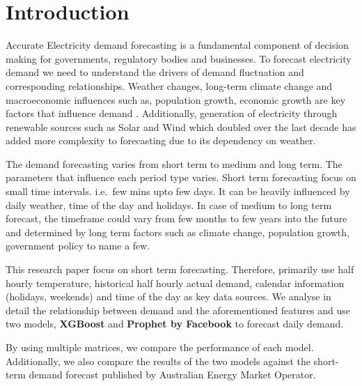 \documentclass[mstat,12pt]{unswthesis}
\begin{document}
%
%






\chapter{Introduction}\label{introduction}

Accurate Electricity demand forecasting is a fundamental component of
decision making for governments, regulatory bodies and businesses. To
forecast electricity demand we need to understand the drivers of demand
fluctuation and corresponding relationships. Weather changes, long-term
climate change and macroeconomic influences such as, population growth,
economic growth are key factors that influence demand \cite{a2024_nem}.
Additionally, generation of electricity through renewable sources such
as Solar and Wind which doubled over the last decade
\cite{energygovau_2024_renewables} has added more complexity to
forecasting due to its dependency on weather.

The demand forecasting varies from short term to medium and long term.
The parameters that influence each period type varies. Short term
forecasting focus on small time intervals. i.e.~few mins upto few days.
It can be heavily influenced by daily weather, time of the day and
holidays. In case of medium to long term forecast, the timeframe could
vary from few months to few years into the future and determined by long
term factors such as climate change, population growth, government
policy to name a few.

This research paper focus on short term forecasting. Therefore,
primarily use half hourly temperature, historical half hourly actual
demand, calendar information (holidays, weekends) and time of the day as
key data sources. We analyse in detail the relationship between demand
and the aforementioned features and use two models, \textbf{XGBoost} and
\textbf{Prophet by Facebook} to forecast daily demand.

By using multiple matrices, we compare the performance of each model.
Additionally, we also compare the results of the two models against the
short-term demand forecast published by Australian Energy Market
Operator.
\end{document}
